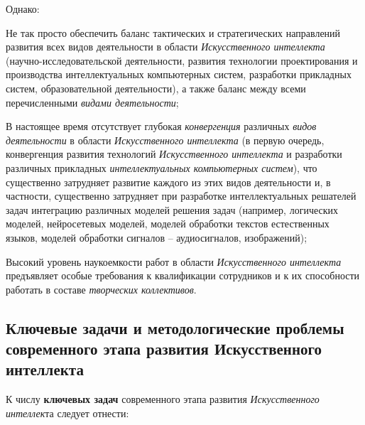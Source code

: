 Однако:
\begin{textitemize}
	\item
	Не так просто обеспечить баланс тактических и стратегических направлений развития всех видов деятельности в области \textit{Искусственного интеллекта} (научно-исследовательской деятельности, развития технологии проектирования и производства интеллектуальных компьютерных систем, разработки прикладных систем, образовательной деятельности), а также баланс между всеми перечисленными \textit{видами деятельности};
	\item
	В настоящее время отсутствует глубокая \textit{конвергенция} различных \textit{видов деятельности} в области \textit{Искусственного интеллекта} (в первую очередь, конвергенция развития технологий \textit{Искусственного интеллекта} и разработки различных прикладных \textit{интеллектуальных компьютерных систем}), что существенно затрудняет развитие каждого из этих видов деятельности и, в частности, существенно затрудняет при разработке интеллектуальных решателей задач интеграцию различных моделей решения задач (например, логических моделей, нейросетевых моделей, моделей обработки текстов естественных языков, моделей обработки сигналов -- аудиосигналов, изображений);
	\item
	Высокий уровень наукоемкости работ в области \textit{Искусственного интеллекта} предъявляет особые требования к квалификации сотрудников и к их способности работать в составе \textit{творческих коллективов}.
\end{textitemize}

\subsection{Ключевые задачи и методологические проблемы современного этапа развития Искусственного интеллекта}

К числу \textbf{ключевых задач} современного этапа развития \textit{Искусственного интеллек}та следует отнести:

